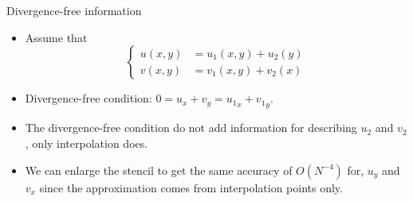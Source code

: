 \documentclass{beamer}
\begin{document}
\begin{frame}{Divergence-free information}
  \begin{itemize}
    \item Assume that
      \begin{equation*}
	\left\{
        \begin{aligned}
	  u(x,y) &= u_1(x,y) + u_2(y) \\
	  v(x,y) &= v_1(x,y) + v_2(x)
        \end{aligned}
	\right.
      \end{equation*}

    \item Divergence-free condition: $0 = u_x + v_y = {u_1}_x + {v_1}_y$.

    \item The divergence-free condition do not add information for describing
      $u_2$ and $v_2$, only interpolation does.

    \item We can enlarge the stencil to get the same accuracy of $O(N^{-4})$ 
      for, $u_y$ and $v_x$ since the approximation comes from interpolation
      points only.
  \end{itemize}
\end{frame}
\end{document}
